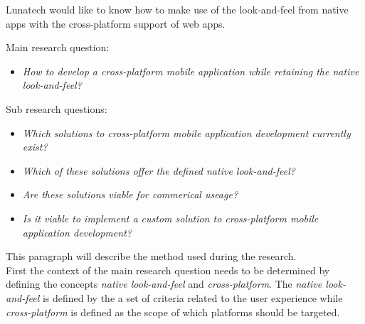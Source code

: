 Lunatech would like to know how to make use of the look-and-feel from native apps with the cross-platform support of web apps.


Main research question:
\begin{itemize}
\item \emph{How to develop a cross-platform mobile application while retaining the native look-and-feel?}
\end{itemize}

\noindent Sub research questions:
\begin{itemize}
\item \emph{Which solutions to cross-platform mobile application development currently exist?}
\item \emph{Which of these solutions offer the defined native look-and-feel?}
\item \emph{Are these solutions viable for commerical useage?}
\item \emph{Is it viable to implement a custom solution to cross-platform mobile application development?}
\end{itemize}


This paragraph will describe the method used during the research.\\

First the context of the main research question needs to be determined by defining the concepts \emph{native look-and-feel} and \emph{cross-platform}. The \emph{native look-and-feel} is defined by the a set of criteria related to the user experience while \emph{cross-platform} is defined as the scope of which platforms should be targeted.




